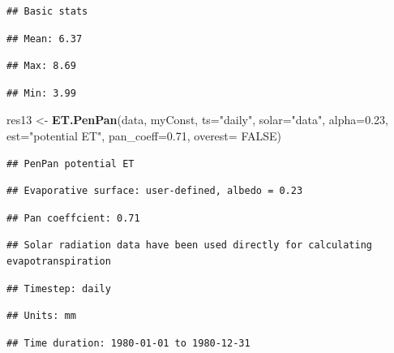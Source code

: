 \documentclass[
]{book}
\newenvironment{Shaded}{\begin{snugshade}}{\end{snugshade}}
\newcommand{\DataTypeTok}[1]{\textcolor[rgb]{0.13,0.29,0.53}{#1}}
\newcommand{\FloatTok}[1]{\textcolor[rgb]{0.00,0.00,0.81}{#1}}
\newcommand{\KeywordTok}[1]{\textcolor[rgb]{0.13,0.29,0.53}{\textbf{#1}}}
\newcommand{\NormalTok}[1]{#1}
\newcommand{\OtherTok}[1]{\textcolor[rgb]{0.56,0.35,0.01}{#1}}
\newcommand{\StringTok}[1]{\textcolor[rgb]{0.31,0.60,0.02}{#1}}
\begin{document}
\begin{verbatim}
## Basic stats
\end{verbatim}

\begin{verbatim}
## Mean: 6.37
\end{verbatim}

\begin{verbatim}
## Max: 8.69
\end{verbatim}

\begin{verbatim}
## Min: 3.99
\end{verbatim}

\begin{Shaded}
\begin{Highlighting}[]
\NormalTok{res13 <-}\StringTok{ }\KeywordTok{ET.PenPan}\NormalTok{(data, myConst, }\DataTypeTok{ts=}\StringTok{"daily"}\NormalTok{, }
                   \DataTypeTok{solar=}\StringTok{"data"}\NormalTok{, }\DataTypeTok{alpha=}\FloatTok{0.23}\NormalTok{,}
                   \DataTypeTok{est=}\StringTok{"potential ET"}\NormalTok{, }\DataTypeTok{pan_coeff=}\FloatTok{0.71}\NormalTok{, }\DataTypeTok{overest=} \OtherTok{FALSE}\NormalTok{)}
\end{Highlighting}
\end{Shaded}

\begin{verbatim}
## PenPan potential ET
\end{verbatim}

\begin{verbatim}
## Evaporative surface: user-defined, albedo = 0.23
\end{verbatim}

\begin{verbatim}
## Pan coeffcient: 0.71
\end{verbatim}

\begin{verbatim}
## Solar radiation data have been used directly for calculating evapotranspiration
\end{verbatim}

\begin{verbatim}
## Timestep: daily
\end{verbatim}

\begin{verbatim}
## Units: mm
\end{verbatim}

\begin{verbatim}
## Time duration: 1980-01-01 to 1980-12-31
\end{verbatim}
\end{document}
